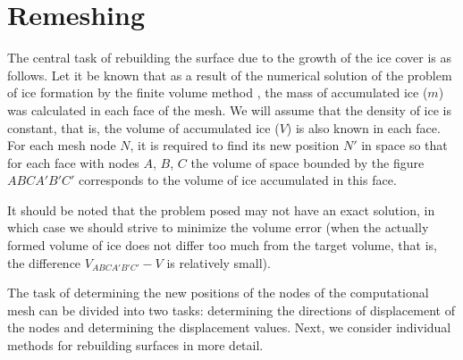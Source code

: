 \documentclass[
11pt,%
tightenlines,%
twoside,%
onecolumn,%
nofloats,%
nobibnotes,%
nofootinbib,%
superscriptaddress,%
noshowpacs,%
centertags]%
{revtex4}
\begin{document}

\section{Remeshing}

The central task of rebuilding the surface due to the growth of the ice cover is as follows.
Let it be known that as a result of the numerical solution of the problem of ice formation by the finite volume method \cite{Beaugendre}, the mass of accumulated ice ($m$) was calculated in each face of the mesh.
We will assume that the density of ice is constant, that is, the volume of accumulated ice ($V$) is also known in each face.
For each mesh node $N$, it is required to find its new position $N'$ in space so that for each face with nodes $A$, $B$, $C$ the volume of space bounded by the figure $ABCA'B'C'$ corresponds to the volume of ice accumulated in this face.

It should be noted that the problem posed may not have an exact solution, in which case we should strive to minimize the volume error (when the actually formed volume of ice does not differ too much from the target volume, that is, the difference $V_{ABCA'B'C'} - V$ is relatively small).

The task of determining the new positions of the nodes of the computational mesh can be divided into two tasks: determining the directions of displacement of the nodes and determining the displacement values.
Next, we consider individual methods for rebuilding surfaces in more detail.
\end{document}
